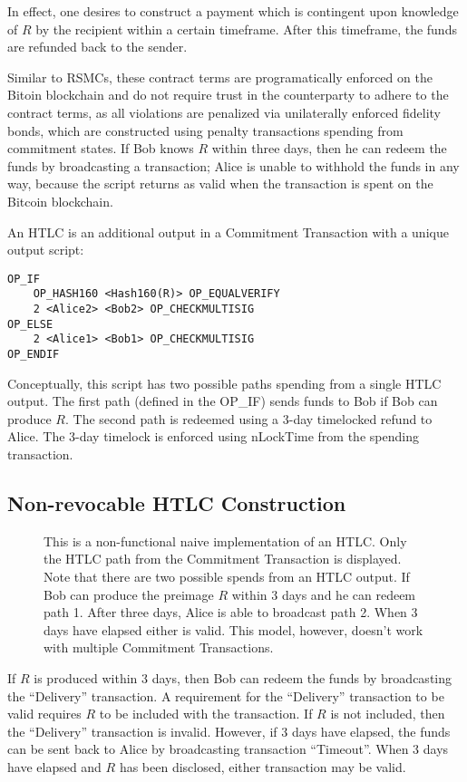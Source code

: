 \documentclass[letterpaper,11pt]{article}
\begin{document}
In effect, one desires to construct a payment which is contingent upon knowledge
of $R$ by the recipient within a certain timeframe. After this timeframe, the
funds are refunded back to the sender.

Similar to RSMCs, these contract terms are programatically enforced on the
Bitoin blockchain and do not require trust in the counterparty to adhere to the
contract terms, as all violations are penalized via unilaterally enforced
fidelity bonds, which are constructed using penalty transactions spending from
commitment states. If Bob knows $R$ within three days, then he can redeem the
funds by broadcasting a transaction; Alice is unable to withhold the funds in
any way, because the script returns as valid when the transaction is spent on
the Bitcoin blockchain.

An HTLC is an additional output in a Commitment Transaction with a unique
output script:

\begin{lstlisting}
OP_IF 
	OP_HASH160 <Hash160(R)> OP_EQUALVERIFY
	2 <Alice2> <Bob2> OP_CHECKMULTISIG
OP_ELSE 
	2 <Alice1> <Bob1> OP_CHECKMULTISIG
OP_ENDIF
\end{lstlisting}

Conceptually, this script has two possible paths spending from a single HTLC
output. The first path (defined in the OP\_IF) sends funds to Bob if Bob can
produce $R$. The second path is redeemed using a 3-day timelocked refund to
Alice. The 3-day timelock is enforced using nLockTime from the spending
transaction.

\subsection{Non-revocable HTLC Construction}

\begin{figure}[H]
	\caption{This is a non-functional naive implementation of an HTLC. Only
		the HTLC path from the Commitment Transaction is displayed. Note
		that there are two possible spends from an HTLC output. If Bob
		can produce the preimage $R$ within 3 days and he can redeem
		path 1. After three days, Alice is able to broadcast path 2.
		When 3 days have elapsed either is valid. This model, however,
		doesn't work with multiple Commitment Transactions.
	}
\end{figure}

If $R$ is produced within 3 days, then Bob can redeem the funds by broadcasting
the ``Delivery'' transaction. A requirement for the ``Delivery'' transaction to
be valid requires $R$ to be included with the transaction. If $R$ is not
included, then the ``Delivery'' transaction is invalid. However, if 3 days have
elapsed, the funds can be sent back to Alice by broadcasting transaction
``Timeout''. When 3 days have elapsed and $R$ has been disclosed, either
transaction may be valid.
\end{document}
